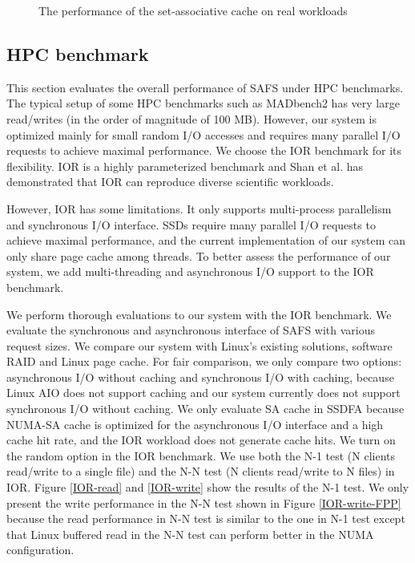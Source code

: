 \begin{figure}[tb]
\begin{center}
\vspace{-15pt}

\vspace{-15pt}
\caption{The performance of the set-associative cache on real workloads}
\label{real_workloads}
\end{center}
\end{figure}

\subsection{HPC benchmark}

This section evaluates the overall performance of SAFS under HPC benchmarks.
The typical setup of some HPC benchmarks
such as MADbench2 \cite{madbench2} has very large read/writes (in the
order of magnitude of 100 MB). However, our system is optimized mainly
for small random I/O accesses and requires many parallel I/O requests to
achieve maximal performance. We choose the IOR benchmark \cite{IOR} for
its flexibility.
IOR is a highly parameterized benchmark and Shan et al. \cite{IOR}
has demonstrated that IOR can reproduce diverse scientific workloads.

However, IOR has some limitations. It only supports
multi-process parallelism and synchronous I/O interface. SSDs require many
parallel I/O requests to achieve maximal performance, and the current
implementation of our system can only share page cache among threads.
To better assess the performance of our system, we add multi-threading
and asynchronous I/O support to the IOR benchmark.

We perform thorough evaluations to our system with the IOR benchmark.
We evaluate the synchronous and asynchronous interface of SAFS with various
request sizes. We compare our
system with Linux's existing solutions, software RAID and Linux page cache.
For fair comparison, we only compare two options: asynchronous I/O without
caching and synchronous I/O with caching, because Linux AIO does not
support caching and our system currently does not support synchronous I/O
without caching. We only evaluate SA cache in SSDFA because NUMA-SA cache
is optimized for the asynchronous I/O interface and a high cache hit rate,
and the IOR workload does not generate cache hits. 
We turn on the random option in the IOR benchmark. We use both the N-1 test
(N clients read/write to a single file) and the N-N test (N clients read/write
to N files) in IOR. Figure \ref{IOR-read} and \ref{IOR-write} show the results
of the N-1 test. We only present the write performance in the N-N test
shown in Figure \ref{IOR-write-FPP} because the read performance in N-N test
is similar to the one in N-1 test except that Linux buffered read in the N-N
test can perform better in the NUMA configuration.

